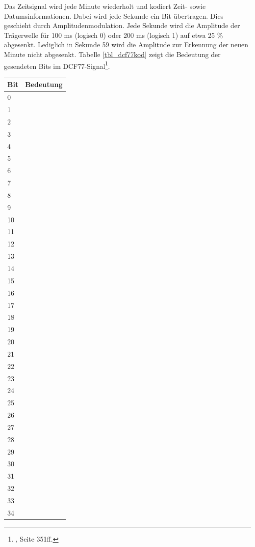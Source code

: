 Das Zeitsignal wird jede Minute wiederholt und kodiert Zeit- sowie Datumsinformationen. Dabei wird jede Sekunde ein Bit übertragen. Dies geschieht durch Amplitudenmodulation. Jede Sekunde wird die Amplitude der Trägerwelle für 100 ms (logisch 0) oder 200 ms (logisch 1) auf etwa 25 \% abgesenkt. Lediglich in Sekunde 59 wird die Amplitude zur Erkennung der neuen Minute nicht abgesenkt. Tabelle \ref{tbl_dcf77kod} zeigt die Bedeutung der gesendeten Bits im DCF77-Signal\footnote{\cite{dcf77}, Seite 351ff.}.
%
\renewcommand{\arraystretch}{1}
\begin{longtable}{|l|l|}
\hline Bit & Bedeutung\\\hline\hline\endhead
\hline\endfoot\endlastfoot
%
0 & \\\hline
1 & \\\hline
2 & \\\hline
3 & \\\hline
4 & \\\hline
5 & \\\hline
6 & \\\hline
7 & \\\hline
8 & \\\hline
9 & \\\hline
10 & \\\hline
11 & \\\hline
12 & \\\hline
13 & \\\hline
14 & \\\hline
15 & \\\hline
16 & \\\hline
17 & \\\hline
18 & \\\hline
19 & \\\hline
20 & \\\hline
21 & \\\hline
22 & \\\hline
23 & \\\hline
24 & \\\hline
25 & \\\hline
26 & \\\hline
27 & \\\hline
28 & \\\hline
29 & \\\hline
30 & \\\hline
31 & \\\hline
32 & \\\hline
33 & \\\hline
34 & \\\hline

\end{longtable}
